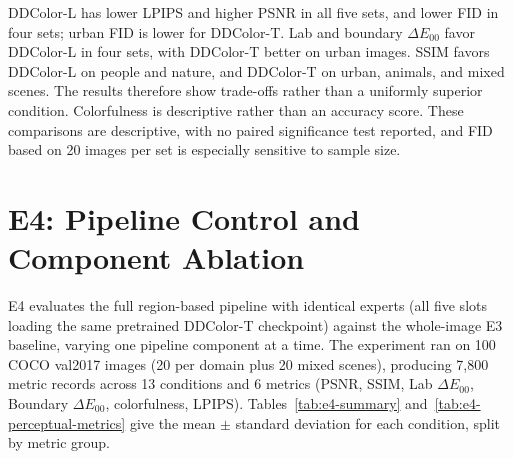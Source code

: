 \documentclass{FastFyp}
\begin{document}
DDColor-L has lower LPIPS and higher PSNR in all five sets, and lower FID in four sets; urban FID is lower for DDColor-T. Lab and boundary $\Delta E_{00}$ favor DDColor-L in four sets, with DDColor-T better on urban images. SSIM favors DDColor-L on people and nature, and DDColor-T on urban, animals, and mixed scenes. The results therefore show trade-offs rather than a uniformly superior condition. Colorfulness is descriptive rather than an accuracy score. These comparisons are descriptive, with no paired significance test reported, and FID based on 20 images per set is especially sensitive to sample size.

\FloatBarrier
\section{E4: Pipeline Control and Component Ablation}
\label{sec:e4-ablation}

E4 evaluates the full region-based pipeline with identical experts (all five
slots loading the same pretrained DDColor-T checkpoint) against the whole-image
E3 baseline, varying one pipeline component at a time. The experiment ran on
100 COCO val2017 images (20 per domain plus 20 mixed scenes), producing 7,800
metric records across 13 conditions and 6 metrics (PSNR, SSIM, Lab $\Delta
E_{00}$, Boundary $\Delta E_{00}$, colorfulness, LPIPS).
Tables~\ref{tab:e4-summary} and~\ref{tab:e4-perceptual-metrics} give the
mean $\pm$ standard deviation for each condition, split by metric group.
\end{document}
